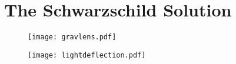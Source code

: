 \chapter{The Schwarzschild Solution}
\begin{figure}[hbtp!]
\centering
\texttt{[image: gravlens.pdf]}
\caption{}
\end{figure}

\begin{figure}[hbtp!]
\centering
 \texttt{[image: lightdeflection.pdf]}
\caption{}
\end{figure}

